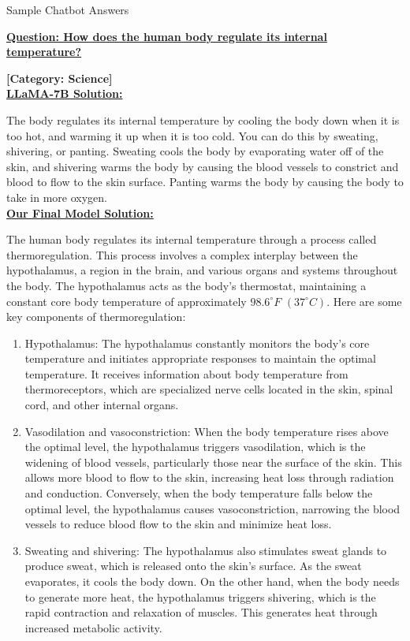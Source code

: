 \begin{AIBox}{Sample Chatbot Answers}
	\parbox[t]{\textwidth}{{\bf \underline{Question: How does the human body regulate its internal temperature?}}}

	\textbf{[Category: Science]}\\

	\textbf{\underline{LLaMA-7B Solution:}}

	The body regulates its internal temperature by cooling the body down when it is too hot, and warming it up when it is too cold. You can do this by sweating, shivering, or panting. Sweating cools the body by evaporating water off of the skin, and shivering warms the body by causing the blood vessels to constrict and blood to flow to the skin surface. Panting warms the body by causing the body to take in more oxygen.\\


	\textbf{\underline{Our Final Model Solution:}}

	The human body regulates its internal temperature through a process called thermoregulation. This process involves a complex interplay between the hypothalamus, a region in the brain, and various organs and systems throughout the body. The hypothalamus acts as the body's thermostat, maintaining a constant core body temperature of approximately $98.6^{\circ}F$ $(37^{\circ}C)$. Here are some key components of thermoregulation:

	\begin{enumerate}
		\item  Hypothalamus: The hypothalamus constantly monitors the body's core temperature and initiates appropriate responses to maintain the optimal temperature. It receives information about body temperature from thermoreceptors, which are specialized nerve cells located in the skin, spinal cord, and other internal organs.

		\item  Vasodilation and vasoconstriction: When the body temperature rises above the optimal level, the hypothalamus triggers vasodilation, which is the widening of blood vessels, particularly those near the surface of the skin. This allows more blood to flow to the skin, increasing heat loss through radiation and conduction. Conversely, when the body temperature falls below the optimal level, the hypothalamus causes vasoconstriction, narrowing the blood vessels to reduce blood flow to the skin and minimize heat loss.

		\item  Sweating and shivering: The hypothalamus also stimulates sweat glands to produce sweat, which is released onto the skin's surface. As the sweat evaporates, it cools the body down. On the other hand, when the body needs to generate more heat, the hypothalamus triggers shivering, which is the rapid contraction and relaxation of muscles. This generates heat through increased metabolic activity.


\end{enumerate}
\end{AIBox}
